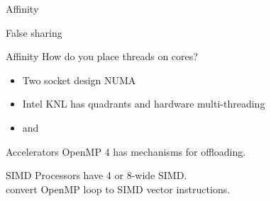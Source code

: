 
\begin{numberedframe}{Affinity}
\end{numberedframe}

\begin{numberedframe}{False sharing}
  
\end{numberedframe}

\begin{numberedframe}{Affinity}
  How do you place threads on cores?
  \begin{itemize}
  \item Two socket design NUMA
  \item Intel KNL has quadrants and hardware multi-threading
  \item {} and 
  \end{itemize}
\end{numberedframe}

%

\begin{numberedframe}{Accelerators}
  OpenMP 4 has mechanisms for offloading.
\end{numberedframe}

\begin{numberedframe}{SIMD}
  Processors have 4 or 8-wide SIMD.\\
  convert OpenMP loop to SIMD vector instructions.
\end{numberedframe}

\endinput

\begin{numberedframe}{}
  \begin{itemize}
  \item 
  \end{itemize}
\end{numberedframe}

